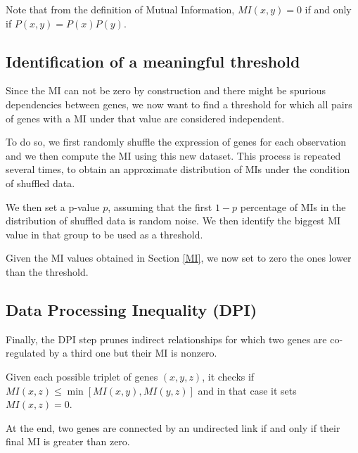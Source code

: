 Note that from the definition of Mutual Information,
$\mathit{MI}(x, y) = 0$
if and only if $P(x, y) = P(x) P(y)$.

\subsection{Identification of a meaningful threshold}
Since the MI can not be zero by construction
and there might be spurious dependencies between genes,
we now want to find a threshold for which
all pairs of genes with a MI under that value are considered independent.

To do so, we first randomly shuffle the expression of genes for each observation
and we then compute the MI using this new dataset.
This process is repeated several times,
to obtain an approximate distribution of MIs under the condition of shuffled data.

We then set a p-value $p$, assuming that the first $1-p$ percentage of
MIs in the distribution of shuffled data is random noise.
We then identify the biggest MI value in that group to be used as a threshold.

Given the MI values obtained in Section \ref{MI},
we now set to zero the ones lower than the threshold.

\subsection{Data Processing Inequality (DPI)}
Finally, the DPI step prunes indirect relationships for which two
genes are co-regulated by a third one but their MI is nonzero.

Given each possible triplet of genes $(x, y, z)$,
it checks if $\mathit{MI}(x, z) \leq \min[\mathit{MI}(x, y), \mathit{MI}(y, z)]$
and in that case it sets $\mathit{MI}(x, z) = 0$.

At the end, two genes are connected by an undirected link if and only if
their final MI is greater than zero.